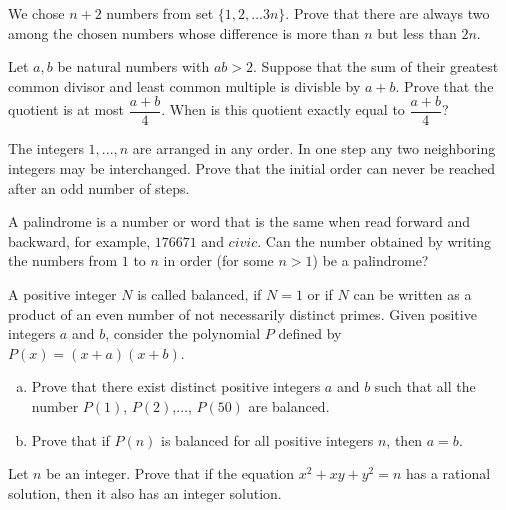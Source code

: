 \documentclass[problems.tex]{subfile}
\begin{document}
	
	
	\begin{problem}
		We chose $n+2$ numbers from set $\{1,2,...3n\}$. Prove that there are always two among the chosen numbers whose difference is more than $n$ but less than $2n$.
	\end{problem}
	
	\begin{problem}[India $2014$]
		Let $a, b$ be natural numbers with $ab > 2$. Suppose that the sum of their greatest common divisor and least common multiple is divisble by $a+ b$. Prove that the quotient is at most $\dfrac{a+b}{4}$. When is this quotient exactly equal to $\dfrac{a+b}{4}$?
	\end{problem}
	
	
	\begin{problem}
		The integers $1,...,n$ are arranged in any order. In one step any two neighboring integers may be interchanged. Prove that the initial order can never be reached after an odd number of steps.
	\end{problem}
	
	\begin{problem}
		A palindrome is a number or word that is the same when read forward and backward, for example, $176671$ and $civic$. Can the number obtained by writing the numbers from $1$ to $n$ in order (for some $n>1$) be a palindrome?
	\end{problem}
	
	\begin{problem}
		A positive integer $N$ is called balanced, if $N=1$ or if $N$ can be written as a product of an even number of not necessarily distinct primes. Given positive integers $a$ and $b$, consider the polynomial $P$ defined by $P(x)=(x+a)(x+b)$.
			\begin{enumerate}[(a)]
				\item Prove that there exist distinct positive integers $a$ and $b$ such that all the number $P(1)$, $P(2)$,$\ldots$, $P(50)$ are balanced.
				\item Prove that if $P(n)$ is balanced for all positive integers $n$, then $a=b$.
			\end{enumerate}	
	\end{problem}
	
	\begin{problem}
		Let $n$ be an integer. Prove that if the equation $x^2+xy+y^2=n$ has a rational solution, then it also has an integer solution.
	\end{problem}
	
\end{document}
